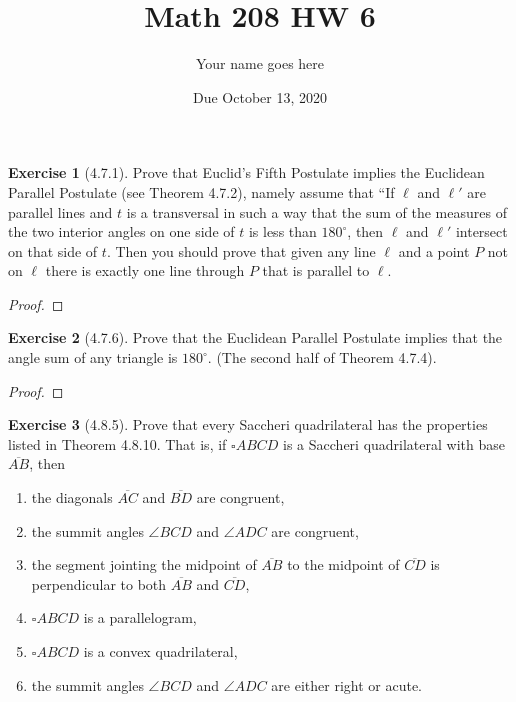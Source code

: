 \documentclass[12pt]{article}		%
\title{Math 208 HW 6}
\author{Your name goes here}
\date{Due October 13, 2020}
\theoremstyle{definition}
\newtheorem*{ex}{Exercise}
\newcommand{\seg}[1]{\overline{#1}}
\begin{document}
	\maketitle
	
	\begin{ex}[4.7.1]
	Prove that Euclid's Fifth Postulate implies the Euclidean Parallel Postulate (see Theorem 4.7.2), namely assume that  ``If $\ell$ and $\ell'
	$ are parallel lines and $t$ is a transversal in such a way that the sum of the measures of the two interior angles on one side of $t$ is less than $180^\circ$, then $\ell$ and $\ell'$ intersect on that side of $t$.  Then you should prove that given any line $\ell$ and a point $P$ not on $\ell$ there is exactly one line through $P$ that is parallel to $\ell$.
\end{ex}

\begin{proof} 
	
\end{proof}

\vspace{1in} %





\begin{ex}[4.7.6]
	Prove that the Euclidean Parallel Postulate implies that the angle sum of any triangle is $180^\circ$.  (The second half of Theorem 4.7.4).
\end{ex}

\begin{proof} 
	
\end{proof}


\vspace{1in} %





\begin{ex}[4.8.5]
	Prove that every Saccheri quadrilateral has the properties listed in Theorem 4.8.10.  That is, if $\square ABCD$ is a Saccheri quadrilateral with base $\seg{AB}$, then
	\begin{enumerate}
		\item the diagonals $\seg{AC}$ and $\seg{BD}$ are congruent,
		\item the summit angles $\angle BCD$ and $\angle ADC$ are congruent,
		\item the segment jointing the midpoint of $\seg{AB}$ to the midpoint of $\seg{CD}$ is perpendicular to both $\seg{AB}$ and $\seg{CD}$,
		\item $\square ABCD$ is a parallelogram,
		\item $\square ABCD$ is a convex quadrilateral,
		\item the summit angles $\angle BCD$ and $\angle ADC$ are either right or acute.
	\end{enumerate}
\end{ex}
\end{document}
